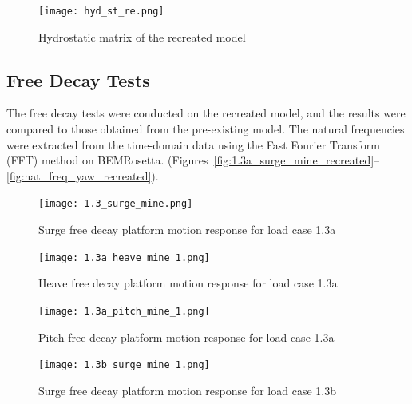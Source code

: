 \documentclass[a4paper, 11pt]{article}
\begin{document}
\begin{figure}[H]
    \centering
    \texttt{[image: hyd\_st\_re.png]}
    \caption{\small Hydrostatic matrix of the recreated model}
    \label{fig:hyd_st_re}
\end{figure}

\subsection{Free Decay Tests}
\hspace*{0.5cm}The free decay tests were conducted on the recreated model, and the results were compared to those obtained from the pre-existing model. The natural frequencies were extracted from the time-domain data using the Fast Fourier Transform (FFT) method on BEMRosetta. (Figures~\ref{fig:1.3a_surge_mine_recreated}--\ref{fig:nat_freq_yaw_recreated}). 

\begin{figure}[H]
    \begin{minipage}{0.47\textwidth}
        \centering
        \texttt{[image: 1.3\_surge\_mine.png]}
        \caption{\small Surge free decay platform motion response for load case 1.3a}
        \label{fig:1.3a_surge_mine_recreated}
    \end{minipage}
    \hfill
    \begin{minipage}{0.49\textwidth}
        \centering
        \texttt{[image: 1.3a\_heave\_mine\_1.png]}
        \caption{\small Heave free decay platform motion response for load case 1.3a}
        \label{fig:1.3a_heave_mine_recreated}
    \end{minipage}
\end{figure}

\begin{figure}[H]
    \begin{minipage}{0.47\textwidth}
        \centering
        \texttt{[image: 1.3a\_pitch\_mine\_1.png]}
        \caption{\small Pitch free decay platform motion response for load case 1.3a}
        \label{fig:1.3a_pitch_mine_recreated}
    \end{minipage}
    \hfill
    \begin{minipage}{0.49\textwidth}
        \centering
        \texttt{[image: 1.3b\_surge\_mine\_1.png]}
        \caption{\small Surge free decay platform motion response for load case 1.3b}
        \label{fig:1.3b_surge_mine_recreated}
    \end{minipage}
\end{figure}
\end{document}
